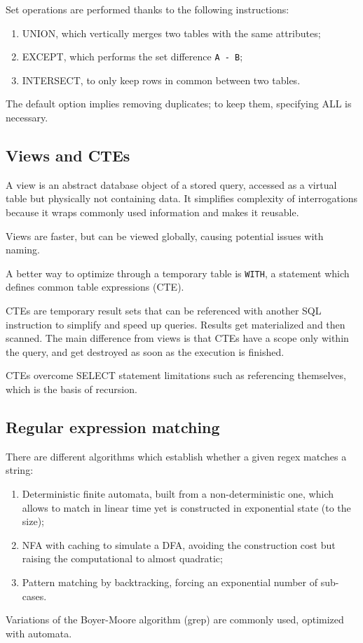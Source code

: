 Set operations are performed thanks to the following instructions:
\begin{enumerate}
	\item UNION, which vertically merges two tables with the same attributes;
	\item EXCEPT, which performs the set difference \texttt{A - B};
	\item INTERSECT, to only keep rows in common between two tables.
\end{enumerate}
The default option implies removing duplicates; to keep them, specifying ALL is necessary.

\subsection{Views and CTEs}
A view is an abstract database object of a stored query, accessed as a virtual table but physically not containing data. It simplifies complexity of interrogations because it wraps commonly used information and makes it reusable.

Views are faster, but can be viewed globally, causing potential issues with naming. 

A better way to optimize through a temporary table is \texttt{WITH}, a statement which defines common table expressions (CTE).

CTEs are temporary result sets that can be referenced with another SQL instruction to simplify and speed up queries. Results get materialized and then scanned. The main difference from views is that CTEs have a scope only within the query, and get destroyed as soon as the execution is finished. 

CTEs overcome SELECT statement limitations such as referencing themselves, which is the basis of recursion. 

\subsection{Regular expression matching}
There are different algorithms which establish whether a given regex matches a string:
\begin{enumerate}
	\item Deterministic finite automata, built from a non-deterministic one, which allows to match in linear time yet is constructed in exponential state (to the size);
	\item NFA with caching to simulate a DFA, avoiding the construction cost but raising the computational to almost quadratic;
	\item Pattern matching by backtracking, forcing an exponential number of sub-cases.
\end{enumerate}
Variations of the Boyer-Moore algorithm (grep) are commonly used, optimized with automata. 


